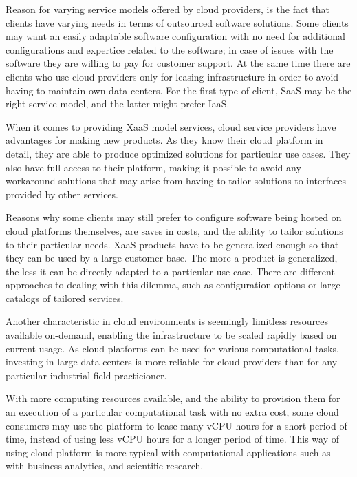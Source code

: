 Reason for varying service models offered by cloud providers, is the fact that
clients have varying needs in terms of outsourced software solutions. Some
clients may want an easily adaptable software configuration with no need for
additional configurations and expertice related to the software; in case of
issues with the software they are willing to pay for customer support. At the
same time there are clients who use cloud providers only for leasing
infrastructure in order to avoid having to maintain own data centers. For the
first type of client, SaaS may be the right service model, and the latter might
prefer IaaS.

When it comes to providing XaaS model services, cloud service providers have
advantages for making new products. As they know their cloud platform in
detail, they are able to produce optimized solutions for particular use cases.
They also have full access to their platform, making it possible to avoid any
workaround solutions that may arise from having to tailor solutions to
interfaces provided by other services.

Reasons why some clients may still prefer to configure software being hosted on
cloud platforms themselves, are saves in costs, and the ability to tailor
solutions to their particular needs. XaaS products have to be generalized
enough so that they can be used by a large customer base. The more a product is
generalized, the less it can be directly adapted to a particular use case.
There are different approaches to dealing with this dilemma, such as
configuration options or large catalogs of tailored services.

Another characteristic in cloud environments is seemingly limitless resources
available on-demand, enabling the infrastructure to be scaled rapidly based on
current usage. As cloud platforms can be used for various computational tasks,
investing in large data centers is more reliable for cloud providers than for
any particular industrial field practicioner.

With more computing resources available, and the ability to provision them for
an execution of a particular computational task with no extra cost, some cloud
consumers may use the platform to lease many vCPU hours for a short period of
time, instead of using less vCPU hours for a longer period of time. This way of
using cloud platform is more typical with computational applications such as
with business analytics, and scientific research.

